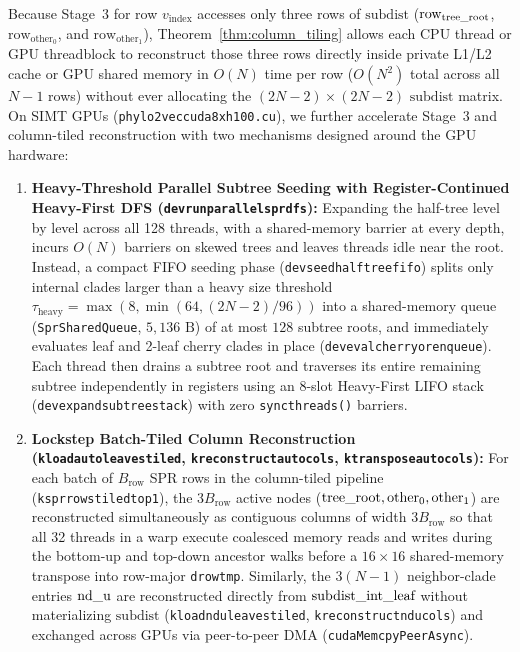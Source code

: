 \documentclass[11pt,a4paper]{article}
\makeatletter
\DeclareRobustCommand{\_}{\ifmmode\nfss@text{\textunderscore}\else\textunderscore\allowbreak\fi}
\theoremstyle{definition}
\makeatother
\begin{document}
Because Stage~3 for row $v_{\text{index}}$ accesses only three rows of $\text{subdist}$ ($\text{row}_{\text{tree\_root}}$, $\text{row}_{\text{other}_0}$, and $\text{row}_{\text{other}_1}$), Theorem~\ref{thm:column_tiling} allows each CPU thread or GPU threadblock to reconstruct those three rows directly inside private L1/L2 cache or GPU shared memory in $O(N)$ time per row ($O(N^2)$ total across all $N-1$ rows) without ever allocating the $(2N-2) \times (2N-2)$ $\text{subdist}$ matrix. On SIMT GPUs (\texttt{phylo2vec\_cuda\_8xh100.cu}), we further accelerate Stage~3 and column-tiled reconstruction with two mechanisms designed around the GPU hardware:
\begin{enumerate}
    \item \textbf{Heavy-Threshold Parallel Subtree Seeding with Register-Continued Heavy-First DFS (\texttt{dev\_run\_parallel\_spr\_dfs}):} Expanding the half-tree level by level across all 128 threads, with a shared-memory barrier at every depth, incurs $O(N)$ barriers on skewed trees and leaves threads idle near the root. Instead, a compact FIFO seeding phase (\texttt{dev\_seed\_half\_tree\_fifo}) splits only internal clades larger than a heavy size threshold $\tau_{\text{heavy}} = \max(8, \min(64, (2N-2)/96))$ into a shared-memory queue (\texttt{SprSharedQueue}, $5{,}136\text{ B}$) of at most $128$ subtree roots, and immediately evaluates leaf and 2-leaf cherry clades in place (\texttt{dev\_eval\_cherry\_or\_enqueue}). Each thread then drains a subtree root and traverses its entire remaining subtree independently in registers using an 8-slot Heavy-First LIFO stack (\texttt{dev\_expand\_subtree\_stack}) with zero \texttt{\_\_syncthreads()} barriers.
    \item \textbf{Lockstep Batch-Tiled Column Reconstruction (\texttt{k\_load\_auto\_leaves\_tiled}, \texttt{k\_reconstruct\_auto\_cols}, \texttt{k\_transpose\_auto\_cols}):} For each batch of $B_{\text{row}}$ SPR rows in the column-tiled pipeline (\texttt{k\_spr\_rows\_tiled\_top1}), the $3 B_{\text{row}}$ active nodes ($\text{tree\_root}, \text{other}_0, \text{other}_1$) are reconstructed simultaneously as contiguous columns of width $3 B_{\text{row}}$ so that all 32 threads in a warp execute coalesced memory reads and writes during the bottom-up and top-down ancestor walks before a $16 \times 16$ shared-memory transpose into row-major \texttt{d\_row\_tmp}. Similarly, the $3(N-1)$ neighbor-clade entries $\text{nd\_u}$ are reconstructed directly from $\text{subdist\_int\_leaf}$ without materializing $\text{subdist}$ (\texttt{k\_load\_nd\_u\_leaves\_tiled}, \texttt{k\_reconstruct\_nd\_u\_cols}) and exchanged across GPUs via peer-to-peer DMA (\texttt{cudaMemcpyPeerAsync}).
\end{enumerate}
\end{document}
